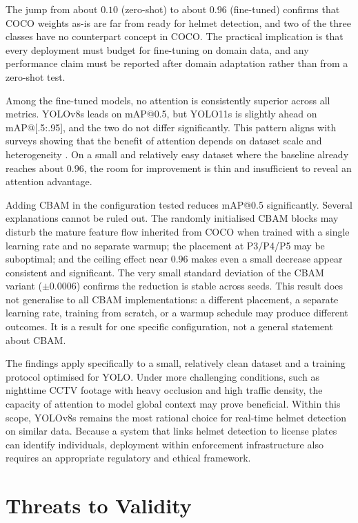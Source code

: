 \documentclass[conference]{IEEEtran}
\begin{document}
The jump from about $0.10$ (zero-shot) to about $0.96$ (fine-tuned) confirms that COCO weights as-is are far from ready for helmet detection, and two of the three classes have no counterpart concept in COCO. The practical implication is that every deployment must budget for fine-tuning on domain data, and any performance claim must be reported after domain adaptation rather than from a zero-shot test.

Among the fine-tuned models, no attention is consistently superior across all metrics. YOLOv8s leads on mAP@0.5, but YOLO11s is slightly ahead on mAP@[.5:.95], and the two do not differ significantly. This pattern aligns with surveys showing that the benefit of attention depends on dataset scale and heterogeneity \cite{ref17, ref18}. On a small and relatively easy dataset where the baseline already reaches about $0.96$, the room for improvement is thin and insufficient to reveal an attention advantage.

Adding CBAM in the configuration tested reduces mAP@0.5 significantly. Several explanations cannot be ruled out. The randomly initialised CBAM blocks may disturb the mature feature flow inherited from COCO when trained with a single learning rate and no separate warmup; the placement at P3/P4/P5 may be suboptimal; and the ceiling effect near $0.96$ makes even a small decrease appear consistent and significant. The very small standard deviation of the CBAM variant ($\pm 0.0006$) confirms the reduction is stable across seeds. This result does not generalise to all CBAM implementations: a different placement, a separate learning rate, training from scratch, or a warmup schedule may produce different outcomes. It is a result for one specific configuration, not a general statement about CBAM.

The findings apply specifically to a small, relatively clean dataset and a training protocol optimised for YOLO. Under more challenging conditions, such as nighttime CCTV footage with heavy occlusion and high traffic density, the capacity of attention to model global context may prove beneficial. Within this scope, YOLOv8s remains the most rational choice for real-time helmet detection on similar data. Because a system that links helmet detection to license plates can identify individuals, deployment within enforcement infrastructure also requires an appropriate regulatory and ethical framework.

\section{Threats to Validity}
\end{document}
